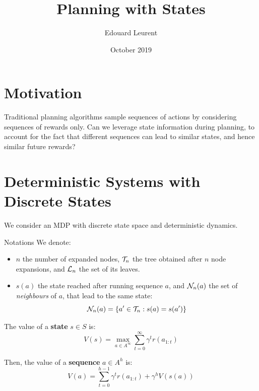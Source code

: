 \documentclass{article}
\title{Planning with States}
\author{Edouard Leurent}
\date{October 2019}
\begin{document}
\maketitle

\section{Motivation}

Traditional planning algorithms sample sequences of actions by considering sequences of rewards only. Can we leverage state information during planning, to account for the fact that different sequences can lead to similar states, and hence similar future rewards?

\section{Deterministic Systems with Discrete States}

We consider an MDP with discrete state space and deterministic dynamics.

\begin{paragraph}{Notations}
We denote:
\begin{itemize}
\item $n$ the number of expanded nodes, $\mathcal{T}_n$ the tree obtained after $n$ node expansions, and $\mathcal{L}_n$ the set of its leaves.
    \item $s(a)$ the state reached after running sequence $a$, and $\mathcal{N}_n(a)$ the set of \emph{neighbours} of $a$, that lead to the same state:  \[\mathcal{N}_n(a) = \{a'\in\mathcal{T}_n: s(a)=s(a')\}\]
\end{itemize}
\end{paragraph}

\begin{definition}[Values]
The value of a \textbf{state} $s\in S$ is:
\begin{equation}
    V(s) = \max_{a\in A^\infty} \sum_{t=0}^\infty \gamma^t r(a_{1:t})
\end{equation}




Then, the value of a \textbf{sequence} $a\in A^h$ is:
\begin{equation}
\label{eq:state_value}
    V(a) = \sum_{t=0}^{h-1} \gamma^t r(a_{1:t}) + \gamma^{h} V(s(a))
\end{equation}
\end{definition}
\end{document}
